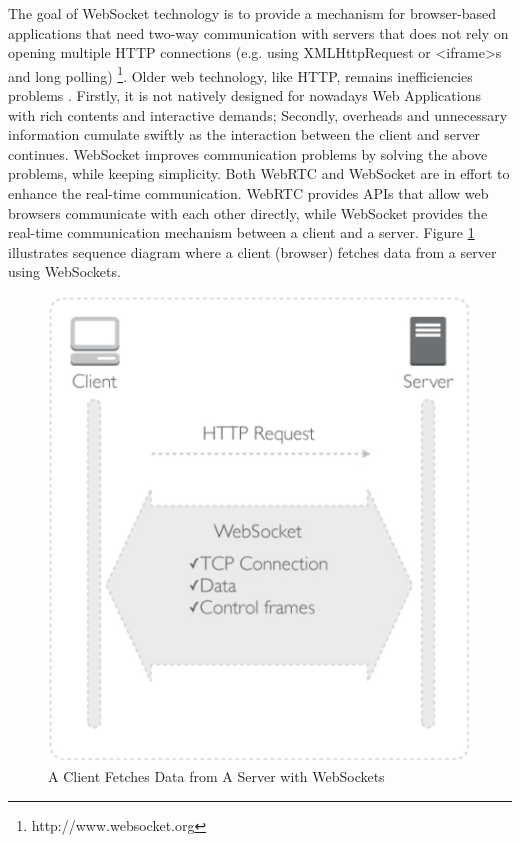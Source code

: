 The goal of WebSocket technology is to provide a mechanism for browser-based applications that need two-way communication with servers that does not rely on opening multiple HTTP connections (e.g. using XMLHttpRequest or <iframe>s and long polling) \footnote{http://www.websocket.org}. Older web technology, like HTTP, remains inefficiencies problems \cite{wang2012definitive}. Firstly, it is not natively designed for nowadays Web Applications with rich contents and interactive demands; Secondly, overheads and unnecessary information cumulate swiftly as the interaction between the client and server continues. WebSocket improves communication problems by solving the above problems, while keeping simplicity. Both WebRTC and WebSocket are in effort to enhance the real-time communication. WebRTC provides APIs that allow web browsers communicate with each other directly, while WebSocket provides the real-time communication mechanism between a client and a server. Figure \ref{fig:client-server-ws} illustrates sequence diagram where a client (browser) fetches data from a server using WebSockets.

\begin{figure}[ht]
  \begin{center}
    \includegraphics[width=1\textwidth]{images/client-server-ws.pdf}
    \caption{A Client Fetches Data from A Server with WebSockets}
    \label{fig:client-server-ws}
  \end{center}
\end{figure}

